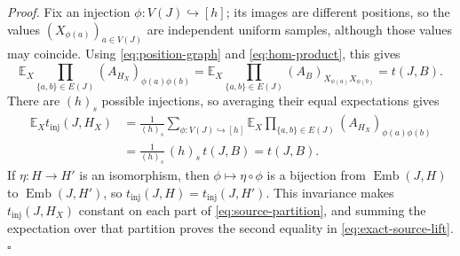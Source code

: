\documentclass[11pt]{article}
\newcommand{\E}{\mathbb E}
\begin{document}
\noindent\emph{Proof.}
Fix an injection $\phi:V(J)\hookrightarrow[h]$; its images are different positions, so the values $(X_{\phi(a)})_{a\in V(J)}$ are independent uniform samples, although those values may coincide.
Using \eqref{eq:position-graph} and \eqref{eq:hom-product}, this gives
\[
\E_X\prod_{\{a,b\}\in E(J)}(A_{H_X})_{\phi(a)\phi(b)}
=\E_X\prod_{\{a,b\}\in E(J)}(A_B)_{X_{\phi(a)}X_{\phi(b)}}
=t(J,B).
\]
There are $(h)_s$ possible injections, so averaging their equal expectations gives
\begin{align*}
\E_X t_{\mathrm{inj}}(J,H_X)
&=\frac1{(h)_s}\sum_{\phi:V(J)\hookrightarrow[h]}
\E_X\prod_{\{a,b\}\in E(J)}(A_{H_X})_{\phi(a)\phi(b)}\\
&=\frac1{(h)_s}\,(h)_s\,t(J,B)=t(J,B).
\end{align*}
If $\eta:H\to H'$ is an isomorphism, then $\phi\mapsto\eta\circ\phi$ is a bijection from $\operatorname{Emb}(J,H)$ to $\operatorname{Emb}(J,H')$, so $t_{\mathrm{inj}}(J,H)=t_{\mathrm{inj}}(J,H')$.
This invariance makes $t_{\mathrm{inj}}(J,H_X)$ constant on each part of \eqref{eq:source-partition}, and summing the expectation over that partition proves the second equality in \eqref{eq:exact-source-lift}.\hfill$\square$
\end{document}
